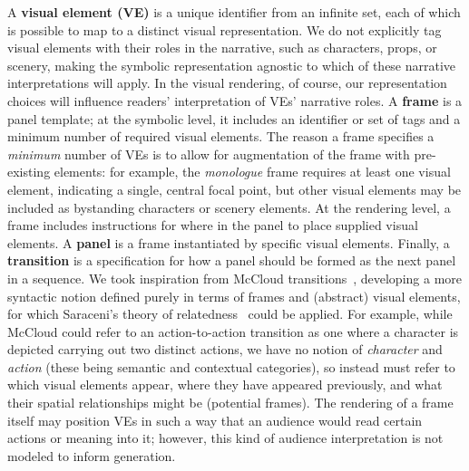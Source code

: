 A {\bf visual element (VE)} is a unique identifier from an infinite set,
each of which is possible to map to a distinct visual representation.
We do not explicitly tag visual elements with their roles in the narrative,
such as characters, props, or scenery, making the symbolic representation
agnostic to which of these narrative interpretations will apply. In the
visual rendering, of course, our representation choices will influence
readers' interpretation of VEs' narrative roles.
%
A {\bf frame} is a panel template; at the symbolic level, it
includes an identifier or set of tags and a minimum number of required
visual elements. The reason a frame specifies a {\em minimum} number of VEs
is to allow for augmentation of the frame with pre-existing elements: for
example, the {\em monologue} frame requires at least one visual element,
indicating a single, central focal point, but other visual elements may be
included as bystanding characters or scenery elements.
At the rendering level, a frame includes instructions for where in the
panel to place supplied visual elements.
A {\bf panel} is a frame instantiated by specific visual elements.
%
%
Finally, a {\bf transition} is a specification for how a panel should be
formed as the next panel in a sequence.
%
We took inspiration from McCloud
transitions~\cite{mcCloud1993understanding}, developing a more
syntactic notion  defined purely in terms of frames and (abstract) visual
elements, for which Saraceni's theory of
relatedness~\cite{saraceni2016relatedness} could be applied. For example,
while McCloud could refer to an action-to-action transition as one where a
character is depicted carrying out two distinct actions, we have no notion
of {\em character} and {\em action} (these being semantic and contextual
categories), so instead must refer to which visual elements appear, where
they have appeared previously, and what their spatial relationships might
be (potential frames). The rendering of a frame itself may position VEs in
such a way that an audience would read certain actions or meaning into it;
however, this kind of audience interpretation is not modeled to inform
generation.

